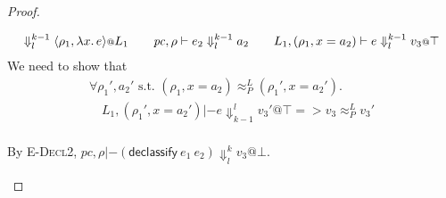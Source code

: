 \documentclass{article}
\makeatletter
\theoremstyle{definition}
\newcommand{\at}{\ensuremath{{\scriptstyle{@}}}}
\newcommand{\pc}{\ensuremath{{\mathit{pc}}}}
\makeatother
\begin{document}
\begin{proof}
\begin{enumerate}
\begin{itemize}
\[{\begin{array}{l@{\qquad}l@{\qquad}l}
          \Downarrow^{k-1}_{l}
          \langle{\rho_1, \lambda{x}.\, e\rangle} \at L_1
          &
          \pc, \rho |- e_2
          \Downarrow^{k-1}_{l}
          a_2
          &
          L_1, (\rho_1, x = a_2) |- e
          \Downarrow^{k-1}_{l}
          v_3 \at \top
        \end{array}}
      \]
      We need to show that
      \[
      {\begin{array}{l}
          \forall{\rho_1', a_2' \text{ s.t. }
            (\rho_1, x = a_2) \approx^{L}_{P} (\rho_1', x = a_2')}.
          \\\quad
          L_1, (\rho_1', x = a_2') |- e \Downarrow^{l}_{k-1} v_3' \at \top =>
          v_3 \approx^{L}_{P} v_3'
        \end{array}}
      \]
      \\[70ex]
      By \textsc{E-Decl2},
      $\pc, \rho |- (\mathsf{declassify}\ e_1\ e_2)
      \Downarrow^{k}_{l}
      v_3 \at \bot$.
      \qedhere
      \end{itemize}
    \end{enumerate}
\end{proof}
\end{document}
